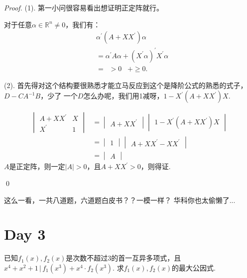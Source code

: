\begin{proof}
	(1). 第一小问很容易看出想证明正定阵就行。

	对于任意$\alpha \in \mathbb{R}^n \neq 0$，我们有：
	\begin{align*}
		&\alpha^\prime (A+XX^\prime) \alpha \\
		&=\alpha^\prime A \alpha + (X^\prime \alpha)^\prime X^\prime \alpha \\
		&=  \,\,\, >0 \,\,\,\,\, +  \geq 0.
	\end{align*}

	(2). 首先得对这个结构要很熟悉才能立马反应到这个是降阶公式的熟悉的式子，$D-CA^{-1}B$，少了
	一个$D$怎么办呢，我们用1减呀，$1-X^\prime (A+XX^\prime)X$.

	\begin{align*}
		\begin{vmatrix}
			A+XX^\prime & X \\
			X^\prime & 1
		\end{vmatrix} 
		&= 
		\begin{vmatrix}
			A+XX^\prime
		\end{vmatrix}
		\begin{vmatrix}
			1 - X^\prime (A+XX^\prime)X
		\end{vmatrix}
		\\
		&= 
		\begin{vmatrix}
			1
		\end{vmatrix}
		\begin{vmatrix}
			A+XX^\prime - XX^\prime 
		\end{vmatrix}
		\\
		&= \begin{vmatrix}
			A
		\end{vmatrix}
	\end{align*}
	$A$是正定阵，则一定$|A|>0$，且$A+XX^\prime>0$，则得证.

	\qed{}
\end{proof}

这么一看，一共八道题，六道题白皮书？？一模一样？ 华科你也太偷懒了... 

\section*{Day 3}

\begin{ex}[武大 2022]
	已知$f_1(x),f_2(x)$是次数不超过3的首一互异多项式，且$x^4+x^2+1 \,|\, f_1(x^3)+x^4\cdot f_2(x^3)$. 求$f_1(x),f_2(x)$的最大公因式.
\end{ex}

